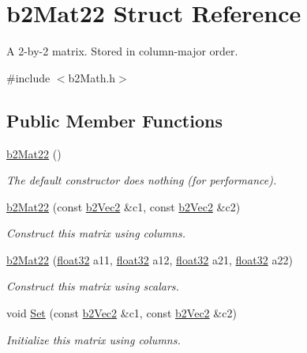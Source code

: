 \hypertarget{structb2_mat22}{}\section{b2\+Mat22 Struct Reference}
\label{structb2_mat22}


A 2-\/by-\/2 matrix. Stored in column-\/major order.  




{\ttfamily \#include $<$b2\+Math.\+h$>$}

\subsection*{Public Member Functions}
\begin{DoxyCompactItemize}
\item 
\mbox{\hyperlink{structb2_mat22_ac3e10f6d457c8dab9062ba378f66bc4d}{b2\+Mat22}} ()
\begin{DoxyCompactList}\small\item\em The default constructor does nothing (for performance). \end{DoxyCompactList}\item 
\mbox{\hyperlink{structb2_mat22_abd674c6d92e26962977f34bcd92ff24d}{b2\+Mat22}} (const \mbox{\hyperlink{structb2_vec2}{b2\+Vec2}} \&c1, const \mbox{\hyperlink{structb2_vec2}{b2\+Vec2}} \&c2)
\begin{DoxyCompactList}\small\item\em Construct this matrix using columns. \end{DoxyCompactList}\item 
\mbox{\hyperlink{structb2_mat22_a41d5d8743bda32cb8c6e212528934810}{b2\+Mat22}} (\mbox{\hyperlink{b2_settings_8h_aacdc525d6f7bddb3ae95d5c311bd06a1}{float32}} a11, \mbox{\hyperlink{b2_settings_8h_aacdc525d6f7bddb3ae95d5c311bd06a1}{float32}} a12, \mbox{\hyperlink{b2_settings_8h_aacdc525d6f7bddb3ae95d5c311bd06a1}{float32}} a21, \mbox{\hyperlink{b2_settings_8h_aacdc525d6f7bddb3ae95d5c311bd06a1}{float32}} a22)
\begin{DoxyCompactList}\small\item\em Construct this matrix using scalars. \end{DoxyCompactList}\item 
void \mbox{\hyperlink{structb2_mat22_aed3bee1de38a0b3f36e21c90faa24112}{Set}} (const \mbox{\hyperlink{structb2_vec2}{b2\+Vec2}} \&c1, const \mbox{\hyperlink{structb2_vec2}{b2\+Vec2}} \&c2)
\begin{DoxyCompactList}\small\item\em Initialize this matrix using columns. \end{DoxyCompactList}\item 

\end{DoxyCompactItemize}
